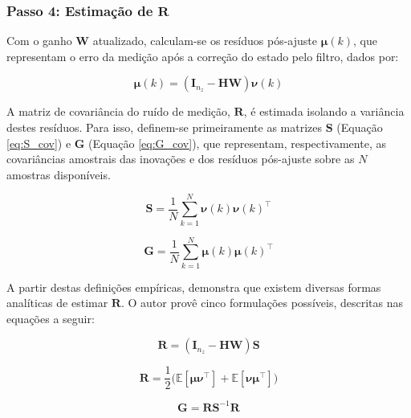 \documentclass[journal]{IEEEtran}
\begin{document}
\subsubsection{\textbf{Passo 4: Estimação de $\mathbf{R}$}}
\label{sec:posProc}
Com o ganho $\mathbf{W}$ atualizado, calculam-se os resíduos pós-ajuste $\boldsymbol{\mu}(k)$, que representam o erro da medição após a correção do estado pelo filtro, dados por:

\begin{equation}
    \label{eq:posfit}
    \boldsymbol{\mu}(k) = (\mathbf{I}_{n_z} - \mathbf{H}\mathbf{W})\boldsymbol{\nu}(k)
\end{equation}

A matriz de covariância do ruído de medição, $\mathbf{R}$, é estimada isolando a variância destes resíduos. Para isso, definem-se primeiramente as matrizes $\mathbf{S}$ (Equação \eqref{eq:S_cov}) e $\mathbf{G}$ (Equação \eqref{eq:G_cov}), que representam, respectivamente, as covariâncias amostrais das inovações e dos resíduos pós-ajuste sobre as $N$ amostras disponíveis.

\begin{equation}
    \label{eq:S_cov}
    \mathbf{S} = \frac{1}{N} \sum_{k=1}^{N} \boldsymbol{\nu}(k)\boldsymbol{\nu}(k)^\top
\end{equation}

\begin{equation}
    \label{eq:G_cov}
    \mathbf{G} = \frac{1}{N} \sum_{k=1}^{N} \boldsymbol{\mu}(k)\boldsymbol{\mu}(k)^\top
\end{equation}

A partir destas definições empíricas, \cite{zhang2020} demonstra que existem diversas formas analíticas de estimar $\mathbf{R}$. O autor provê cinco formulações possíveis, descritas nas equações a seguir:

\begin{equation}
    \label{eq:R_metodo1}
    \mathbf{R} = (\mathbf{I}_{n_z} - \mathbf{H}\mathbf{W})\mathbf{S}
\end{equation}

\begin{equation}
    \label{eq:R_metodo2}
    \mathbf{R} = \frac{1}{2}\Big(\mathbb{E}[\boldsymbol{\mu}\boldsymbol{\nu}^\top] + \mathbb{E}[\boldsymbol{\nu}\boldsymbol{\mu}^\top]\Big)
\end{equation}

\begin{equation}
    \label{eq:G_matriz}
    \mathbf{G} = \mathbf{R}\mathbf{S}^{-1}\mathbf{R}
\end{equation}
\end{document}
